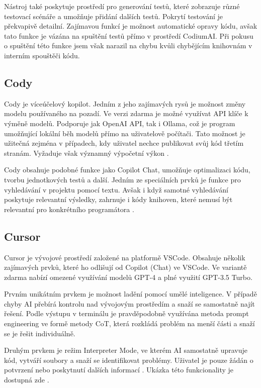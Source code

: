\documentclass[FM,DP]{tulthesis}
\begin{document}
		Nástroj také poskytuje prostředí pro generování testů, které zobrazuje různé testovací scénáře a umožňuje přidání dalších testů. Pokrytí testování je překvapivě detailní. Zajímavou funkcí je možnost automatické opravy kódu, avšak tato funkce je vázána na spuštění testů přímo v prostředí CodiumAI. Při pokusu o spuštění této funkce jsem však narazil na chybu kvůli chybějícím knihovnám v interním spouštěči kódu.
		
		\subsection{Cody}
		Cody je víceúčelový kopilot. Jedním z jeho zajímavých rysů je možnost změny modelu používaného na pozadí. Ve verzi zdarma je možné využívat API klíče k výměně modelů. Podporuje jak OpenAI API, tak i Ollama, což je program umožňující lokální běh modelů přímo na uživatelově počítači. Tato možnost je užitečná zejména v případech, kdy uživatel nechce publikovat svůj kód třetím stranám. Vyžaduje však významný výpočetní výkon \cite{ollama}.
		
		Cody obsahuje podobné funkce jako Copilot Chat, umožňuje optimalizaci kódu, tvorbu jednotkových testů a další. Jedním ze speciálních prvků je funkce pro vyhledávání v projektu pomocí textu. Avšak i když samotné vyhledávání poskytuje relevantní výsledky, zahrnuje i kódy knihoven, které nemusí být relevantní pro konkrétního programátora \cite{cody}.
		
		\subsection{Cursor}
		Cursor je vývojové prostředí založené na platformě VSCode. Obsahuje několik zajímavých prvků, které ho odlišují od Copilot (Chat) ve VSCode. Ve variantě zdarma nabízí omezené využívání modelů GPT-4 a plné využití GPT-3.5 Turbo.
		
		Prvním unikátním prvkem je možnost ladění pomocí umělé inteligence. V případě chyby AI přebírá kontrolu nad vývojovým prostředím a snaží se samostatně najít řešení. Podle výstupu v terminálu je pravděpodobně využívána metoda prompt engineering ve formě metody CoT, která rozkládá problém na menší části a snaží se je řešit individuálně.
		
		Druhým prvkem je režim Interpreter Mode, ve kterém AI samostatně upravuje kód, vytváří soubory a snaží se identifikovat problémy. Uživatel je pouze žádán o potvrzení nebo poskytnutí dalších informací \cite{cursor}. Ukázka této funkcionality je dostupná zde \cite{cursor_showcase}.
		
\end{document}
